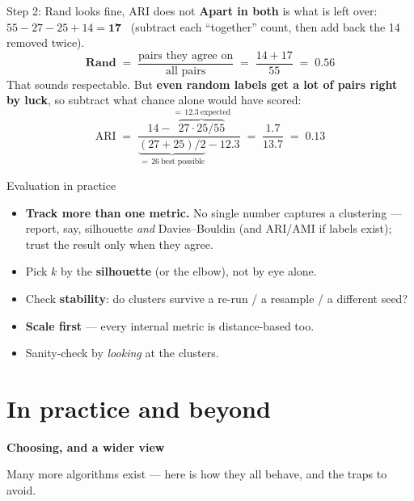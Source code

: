 \documentclass[aspectratio=169]{beamer}
\newcommand{\sectiontransition}[2]{%
  \begin{frame}[plain]
    \vfill
    \begin{center}
      {\Large\color{popblue}\textbf{#1}}\\[0.9em]
      \begin{minipage}{0.82\textwidth}\centering\small #2 \end{minipage}
    \end{center}
    \vfill
  \end{frame}}
\begin{document}
\begin{frame}{Step 2: Rand looks fine, ARI does not}
  \textbf{Apart in both} is what is left over: $55-27-25+14=\mathbf{17}$ \ (subtract each
  ``together'' count, then add back the 14 removed twice).
  \vskip 4pt
  \[
    \textbf{Rand} \;=\; \frac{\text{pairs they agree on}}{\text{all pairs}}
    \;=\; \frac{14+17}{55} \;=\; \mathbf{0.56}
  \]
  \vskip 2pt
  That sounds respectable. But \textbf{even random labels get a lot of pairs right by luck}, so
  subtract what chance alone would have scored:
  \[
    \text{ARI} \;=\; \frac{14 - \overbrace{27\cdot 25/55}^{=\,12.3\ \text{expected}}}
                          {\underbrace{(27+25)/2}_{=\,26\ \text{best possible}} - 12.3}
    \;=\; \frac{1.7}{13.7} \;=\; \mathbf{0.13}
  \]
  \vskip 2pt
\end{frame}

\begin{frame}{Evaluation in practice}
  \begin{itemize}\small
    \item \textbf{Track more than one metric.} No single number captures a clustering --- report,
      say, silhouette \emph{and} Davies--Bouldin (and ARI/AMI if labels exist); trust the result
      only when they agree.
    \item Pick $k$ by the \textbf{silhouette} (or the elbow), not by eye alone.
    \item Check \textbf{stability}: do clusters survive a re-run / a resample / a different seed?
    \item \textbf{Scale first} --- every internal metric is distance-based too.
    \item Sanity-check by \emph{looking} at the clusters.
  \end{itemize}
\end{frame}

\section{In practice and beyond}
\sectiontransition{Choosing, and a wider view}{Many more algorithms exist --- here is how they all
behave, and the traps to avoid.}
\end{document}
